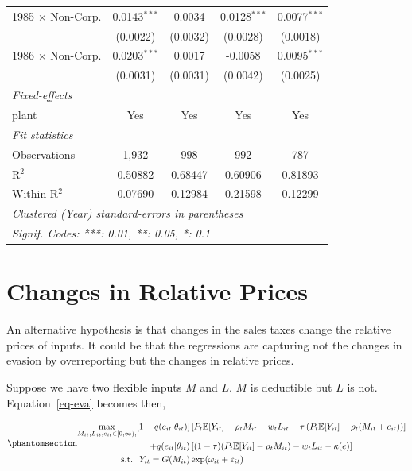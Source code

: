 \documentclass[
  12pt]{article}
\theoremstyle{definition}
\theoremstyle{remark}
\begin{document}
\begin{table}
\begin{minipage}{\linewidth}
\begin{tabular}{lcccc}
   1985 $\times$ Non-Corp.  & 0.0143$^{***}$  & 0.0034          & 0.0128$^{***}$  & 0.0077$^{***}$\\   
                            & (0.0022)        & (0.0032)        & (0.0028)        & (0.0018)\\   
   1986 $\times$ Non-Corp.  & 0.0203$^{***}$  & 0.0017          & -0.0058         & 0.0095$^{***}$\\   
                            & (0.0031)        & (0.0031)        & (0.0042)        & (0.0025)\\   
   \midrule
   \emph{Fixed-effects}\\
   plant                    & Yes             & Yes             & Yes             & Yes\\  
   \midrule
   \emph{Fit statistics}\\
   Observations             & 1,932           & 998             & 992             & 787\\  
   R$^2$                    & 0.50882         & 0.68447         & 0.60906         & 0.81893\\  
   Within R$^2$             & 0.07690         & 0.12984         & 0.21598         & 0.12299\\  
   \midrule \midrule
   \multicolumn{5}{l}{\emph{Clustered (Year) standard-errors in parentheses}}\\
   \multicolumn{5}{l}{\emph{Signif. Codes: ***: 0.01, **: 0.05, *: 0.1}}\\
\end{tabular}
\par\endgroup

\end{minipage}%

\end{table}%

\section{Changes in Relative Prices}\label{changes-in-relative-prices}

An alternative hypothesis is that changes in the sales taxes change the
relative prices of inputs. It could be that the regressions are
capturing not the changes in evasion by overreporting but the changes in
relative prices.

Suppose we have two flexible inputs \(M\) and \(L\). \(M\) is deductible
but \(L\) is not. Equation~\ref{eq-eva} becomes then,

\begin{equation}\phantomsection\label{eq-eva-non-deduct}{
\begin{aligned}
  \max_{M_{it}, L_{it},e_{it}\in [0,\infty), } [1-q(e_{it}|\theta_{it})]&\left[P_t\mathbb{E}[Y_{it}]-\rho_{t} M_{it}-w_{t} L_{it}-\tau\left(P_t\mathbb{E}[Y_{it}]-\rho_{t} (M_{it}+e_{it})\right)\right]\\
  +q(e_{it}|\theta_{it})&\left[(1-\tau)(P_t\mathbb{E}[Y_{it}]-\rho_{t} M_{it})-w_{t} L_{it}-\kappa(e)\right] \\
  \text{s.t. }\; Y_{it}=G(M_{it})&\exp(\omega_{it}+\varepsilon_{it})
\end{aligned}
}\end{equation}
\end{document}
